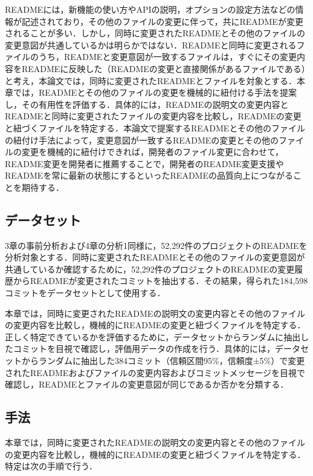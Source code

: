 \documentclass[submit]{ipsj}
\begin{document}
READMEには，新機能の使い方やAPIの説明，オプションの設定方法などの情報が記述されており，その他のファイルの変更に伴って，共にREADMEが変更されることが多い．しかし，同時に変更されたREADMEとその他のファイルの変更意図が共通しているかは明らかではない．READMEと同時に変更されるファイルのうち，READMEと変更意図が一致するファイルは，すぐにその変更内容をREADMEに反映した（READMEの変更と直接関係があるファイルである）と考え，本論文では，同時に変更されたREADMEとファイルを対象とする．本章では，READMEとその他のファイルの変更を機械的に紐付ける手法を提案し，その有用性を評価する．具体的には，READMEの説明文の変更内容とREADMEと同時に変更されたファイルの変更内容を比較し，READMEの変更と紐づくファイルを特定する．本論文で提案するREADMEとその他のファイルの紐付け手法によって，変更意図が一致するREADMEの変更とその他のファイルの変更を機械的に紐付けできれば，開発者のファイル変更に合わせて，README変更を開発者に推薦することで，開発者のREADME変更支援やREADMEを常に最新の状態にするといったREADMEの品質向上につながることを期待する．





\subsection{データセット}
3章の事前分析および4章の分析1同様に，52,292件のプロジェクトのREADMEを分析対象とする．同時に変更されたREADMEとその他のファイルの変更意図が共通しているか確認するために，52,292件のプロジェクトのREADMEの変更履歴からREADMEが変更されたコミットを抽出する．その結果，得られた184,598コミットをデータセットとして使用する．

本章では，同時に変更されたREADMEの説明文の変更内容とその他のファイルの変更内容を比較し，機械的にREADMEの変更と紐づくファイルを特定する．正しく特定できているかを評価するために，データセットからランダムに抽出したコミットを目視で確認し，評価用データの作成を行う．具体的には，データセットからランダムに抽出した384コミット（信頼区間95\%，信頼度±5\%）で変更されたREADMEおよびファイルの変更内容およびコミットメッセージを目視で確認し，READMEとファイルの変更意図が同じであるか否かを分類する．


\subsection{手法}
本章では，同時に変更されたREADMEの説明文の変更内容とその他のファイルの変更内容を比較し，機械的にREADMEの変更と紐づくファイルを特定する．特定は次の手順で行う．
\end{document}
